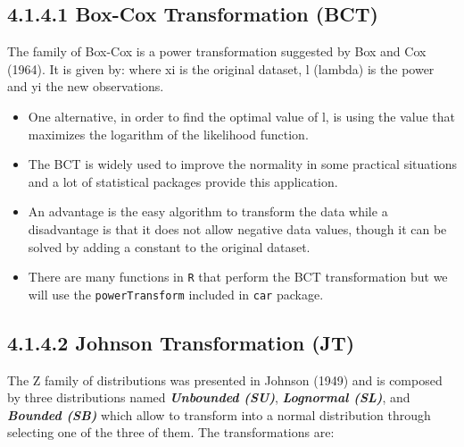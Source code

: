 \documentclass[]{beamer}
\begin{document}
\subsection{4.1.4.1 Box-Cox Transformation (BCT)}
\begin{frame}
The family of Box-Cox is a power transformation suggested by Box and Cox
(1964). It is given by:
where xi is the original dataset, l (lambda) is the power and yi the new observations.
\end{frame}
\begin{frame}
\begin{itemize}
	\item One alternative, in order to find the optimal value of l, is using the value that maximizes the logarithm of the likelihood function. 
	
	\item The BCT is widely used to improve the normality in some practical situations and a lot of statistical packages provide this application. 
	\item An advantage is the easy algorithm to transform the data while a disadvantage is that it does not allow
	negative data values, though it can be solved by adding a constant to the original dataset.
	
	\item There are many functions in \texttt{R} that perform the BCT transformation but we will use the \texttt{powerTransform} included in \texttt{car} package.
\end{itemize}

\end{frame}
\subsection{4.1.4.2 Johnson Transformation (JT)}
\begin{frame}
The Z family of distributions was presented in Johnson (1949) and is composed by
three distributions named \textbf{\textit{Unbounded (SU)}}, \textbf{\textit{Lognormal (SL)}}, and \textbf{\textit{Bounded (SB)}}
which allow to transform into a normal distribution through selecting one of the three of them. The transformations are:

\end{frame}
\end{document}
